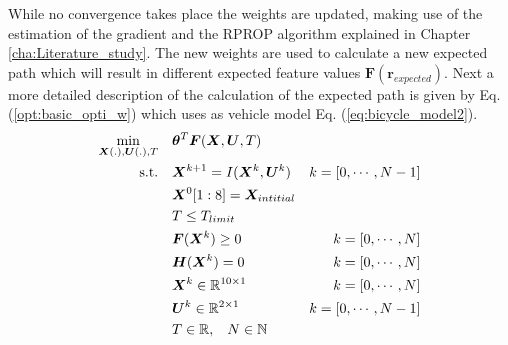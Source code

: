   
While no convergence takes place the weights are updated, making use of the estimation of the gradient and the RPROP algorithm explained in Chapter \ref{cha:Literature_study}. The new weights are used to calculate a new expected path which will result in different expected feature values $\bm{F}(\bm{r}_{expected})$.  Next a more detailed description of the calculation of the expected path is given by Eq. (\ref{opt:basic_opti_w}) which uses as vehicle model Eq. (\ref{eq:bicycle_model2}). \\


\begin{equation}\label{opt:basic_opti_w}
\begin{aligned}
\min_{\bm{X}(.),\bm{U}(.), T} \quad &  \bm{\theta}^T\bm{F}(\bm{X},\bm{U}, T) \\
\textrm{s.t.} \quad & \bm{X}^{k+1} = I(\bm{X}^{k}, \bm{U}^{k}) & k = [0,\cdots, N-1]\\
& \bm{X}^{0}[1:8]= \bm{X}_{intitial} \\
& T \leq T_{limit}\\
& \bm{F}(\bm{X}^{k}) \geq 0	& k = [0,\cdots, N]\\
& \bm{H}(\bm{X}^{k}) = 0	& k = [0,\cdots, N]\\
& \bm{X}^{k}\in \mathbb{R}^{10\times 1}  & k = [0,\cdots, N]\\
& \bm{U}^{k}\in \mathbb{R}^{2\times 1} \hspace{3 mm} & k = [0,\cdots, N-1]\\
& T \in \mathbb{R},\hspace{3 mm} N \in \mathbb{N}
\end{aligned}
\end{equation}

